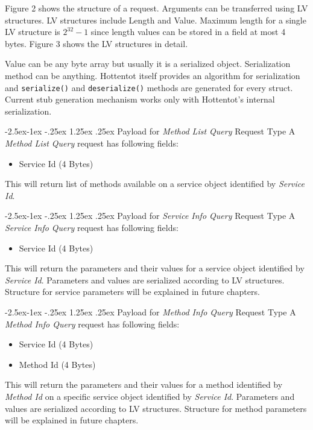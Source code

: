 \documentclass[10pt,a4paper]{article}
\makeatletter
\renewcommand\paragraph{\@startsection{paragraph}{4}{\z@}%
            {-2.5ex\@plus -1ex \@minus -.25ex}%
            {1.25ex \@plus .25ex}%
            {\normalfont\normalsize\bfseries}}
\makeatother
\begin{document}
Figure 2 shows the structure of a request. Arguments can be transferred using LV structures. LV structures include Length and Value. Maximum length for a single LV structure is $2^{32} - 1$ since length values can be stored in a field at most 4 bytes. Figure 3 shows the LV structures in detail.

Value can be any byte array but usually it is a serialized object. Serialization method can be anything. Hottentot itself provides an algorithm for serialization and \texttt {serialize()} and \texttt {deserialize()} methods are generated for every struct. Current stub generation mechanism works only with Hottentot's internal serialization.

\paragraph{Payload for \textit{Method List Query} Request Type} 
A \textit{Method List Query} request has following fields:
\begin{itemize}
  \item Service Id (4 Bytes)
\end{itemize}
This will return list of methods available on a service object identified by \textit{Service Id}.

\paragraph{Payload for \textit{Service Info Query} Request Type} 
A \textit{Service Info Query} request has following fields:
\begin{itemize}
  \item Service Id (4 Bytes)
\end{itemize}
This will return the parameters and their values for a service object identified by \textit{Service Id}. Parameters and values are serialized according to LV structures. Structure for service parameters will be explained in future chapters.

\paragraph{Payload for \textit{Method Info Query} Request Type} 
A \textit{Method Info Query} request has following fields:
\begin{itemize}
  \item Service Id (4 Bytes)
  \item Method Id (4 Bytes)
\end{itemize}
This will return the parameters and their values for a method identified by \textit{Method Id} on a specific service object identified by \textit{Service Id}. Parameters and values are serialized according to LV structures. Structure for method parameters will be explained in future chapters.
\end{document}
